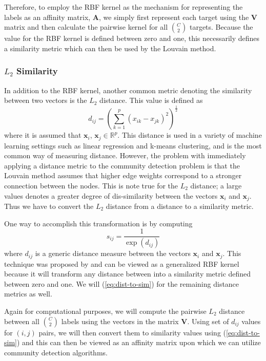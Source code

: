 \documentclass[../thesis.tex]{subfiles}
\begin{document}
Therefore, to employ the RBF kernel as the mechanism for representing the labels as an affinity matrix, $\mathbf{A}$, we simply first represent each target using the $\mathbf{V}$ matrix and then calculate the pairwise kernel for all $\binom{C}{2}$ targets. Because the value for the RBF kernel is defined between zero and one, this necessarily defines a similarity metric which can then be used by the Louvain method.

\subsubsection{$L_2$ Similarity}
In addition to the RBF kernel, another common metric denoting the similarity between two vectors is the $L_2$ distance. This value is defined as
\begin{equation}
    d_{ij} = \left(\sum_{k=1}^p (x_{ik} - x_{jk})^2 \right)^{\frac{1}{2}}
\end{equation}
where it is assumed that $\mathbf{x}_i$, $\mathbf{x}_j \in \mathbb{R}^p$. This distance is used in a variety of machine learning settings such as linear regression and k-means clustering, and is the most common way of measuring distance. However, the problem with immediately applying a distance metric to the community detection problem is that the Louvain method assumes that higher edge weights correspond to a stronger connection between the nodes. This is note true for the $L_2$ distance; a large values denotes a greater degree of dis-similarity between the vectors $\mathbf{x}_i$ and $\mathbf{x}_j$. Thus we have to convert the $L_2$ distance from a distance to a similarity metric.

One way to accomplish this transformation is by computing
\begin{equation}
    \label{eq:dist-to-sim}
    s_{ij} = \frac{1}{\exp(d_{ij})}
\end{equation}
where $d_{ij}$ is a generic distance measure between the vectors $\mathbf{x}_i$ and $\mathbf{x}_j$. This technique was proposed by \cite{haasdonk2004learning} and can be viewed as a generalized RBF kernel because it will transform any distance between into a similarity metric defined between zero and one. We will (\ref{eq:dist-to-sim}) for the remaining distance metrics as well.

Again for computational purposes, we will compute the pairwise $L_2$ distance between all $\binom{C}{2}$ labels using the vectors in the matrix $\mathbf{V}$. Using set of $d_{ij}$ values for $(i,j)$ pairs, we will then convert them to similarity values using (\ref{eq:dist-to-sim}) and this can then be viewed as an affinity matrix upon which we can utilize community detection algorithms.
\end{document}
